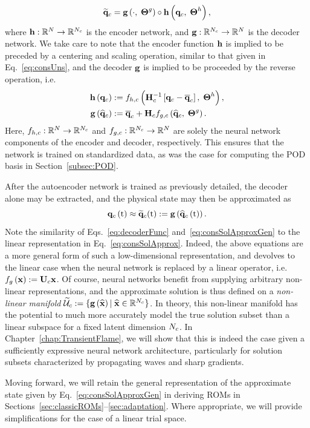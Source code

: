 %
\begin{equation}
    \mathbf{\widetilde{q}}_{c} = \mathbf{g} \left(\cdot, \; \boldsymbol{\Theta}^{g}\right) \circ \mathbf{h} \left(\mathbf{q}_{c}, \; \boldsymbol{\Theta}^{h}\right),
\end{equation}
%
where $\mathbf{h}: \mathbb{R}^{N} \rightarrow \mathbb{R}^{N_c}$ is the encoder network, and $\mathbf{g}: \mathbb{R}^{N_c} \rightarrow \mathbb{R}^{N}$ is the decoder network. We take care to note that the encoder function $\mathbf{h}$ is implied to be preceded by a centering and scaling operation, similar to that given in Eq.~\ref{eq:consUns}, and the decoder $\mathbf{g}$ is implied to be proceeded by the reverse operation, i.e.
%
\begin{align}
    \encoderFunc{\consVec} &\defEq \nnLayer_{\encoderVar,\consVar} \left(\consScaleInv\left[\consVec - \consVecCent\right], \; \nnParams^{\encoderVar}\right), \\
    \decoderFunc{\consVecCoef} &\defEq \consVecCent + \consScale \nnLayer_{\decoderVar,\consVar} \left(\consVecCoef, \; \nnParams^{\decoderVar}\right). \label{eq:decoderFunc}
\end{align}
%
Here, $f_{h,c}: \mathbb{R}^{N} \rightarrow \mathbb{R}^{N_c}$ and $f_{g,c}: \mathbb{R}^{N_c} \rightarrow \mathbb{R}^{N}$ are solely the neural network components of the encoder and decoder, respectively. This ensures that the network is trained on standardized data, as was the case for computing the POD basis in Section~\ref{subsec:POD}.

After the autoencoder network is trained as previously detailed, the decoder alone may be extracted, and the physical state may then be approximated as
%
\begin{equation}\label{eq:consSolApproxGen}
    \mathbf{q}_{c}\left(\text{t}\right) \approx \mathbf{\widetilde{q}}_{c}(\text{t}) := \mathbf{g} \left(\mathbf{\widehat{q}}_{c}\left(\text{t}\right)\right).
\end{equation}
%
Note the similarity of Eqs.~\ref{eq:decoderFunc} and~\ref{eq:consSolApproxGen} to the linear representation in Eq.~\ref{eq:consSolApprox}. Indeed, the above equations are a more general form of such a low-dimensional representation, and devolves to the linear case when the neural network is replaced by a linear operator, i.e. $\nnLayer_{\decoderVar} \left(\nnInput\right) \defEq \consTrial \nnInput$. Of course, neural networks benefit from supplying arbitrary non-linear representations, and the approximate solution is thus defined on a \textit{non-linear manifold} $\consTrialSpace \defEq \{\decoderFunc{\nnInputCoef} \vert \; \nnInputCoef \inROne{\numConsModes} \}$. In theory, this non-linear manifold has the potential to much more accurately model the true solution subset than a linear subspace for a fixed latent dimension $N_c$. In Chapter~\ref{chap:TransientFlame}, we will show that this is indeed the case given a sufficiently expressive neural network architecture, particularly for solution subsets characterized by propagating waves and sharp gradients.

Moving forward, we will retain the general representation of the approximate state given by Eq.~\ref{eq:consSolApproxGen} in deriving ROMs in Sections~\ref{sec:classicROMs}--\ref{sec:adaptation}. Where appropriate, we will provide simplifications for the case of a linear trial space.
